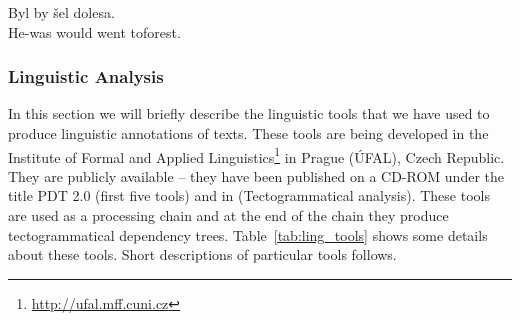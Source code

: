 Byl by šel dolesa.
\\He-was would went toforest.


\subsubsection{Linguistic Analysis}

In this section we will briefly describe the linguistic tools that we have used to produce linguistic annotations of texts. These tools are being developed in the Institute of Formal and Applied Linguistics\footnote{\url{http://ufal.mff.cuni.cz}} in Prague (ÚFAL), Czech Republic. They are publicly available -- they have been published on a CD-ROM under the title PDT 2.0 \citep{biblio:PDT20_CD} (first five tools) and in \citep{biblio:KlTransformationBasedTectogrammatical2006} (Tectogrammatical analysis). These tools are used as a processing chain and at the end of the chain they produce tectogrammatical \citep{biblio:MiBeAnnotationtectogrammatical2006} dependency trees. Table~\ref{tab:ling_tools} shows some details about these tools. Short descriptions of particular tools follows.


